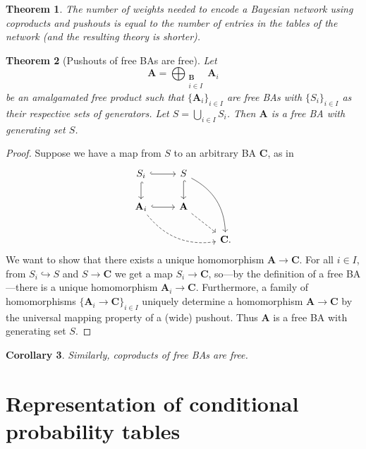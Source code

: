 \documentclass{article}
\newtheorem{theorem}{Theorem}
\newtheorem{corollary}[theorem]{Corollary}
\theoremstyle{definition}
\theoremstyle{remark}
\begin{document}
\begin{theorem}
  The number of weights needed to encode a Bayesian network using
  coproducts and pushouts is equal to the number of entries in the tables of the
  network (and the resulting theory is shorter).
\end{theorem}

\begin{theorem}[Pushouts of free BAs are free]
  Let
  \[
    \mathbf{A} = \bigoplus_{\substack{\mathbf{B}\\ i \in I}} \mathbf{A}_i
  \]
  be an amalgamated free product such that $\{ \mathbf{A}_{i} \}_{i \in I}$ are
  free BAs with $\{ S_i \}_{i \in I}$ as their respective sets of generators.
  Let $S = \bigcup_{i \in I} S_i$. Then $\mathbf{A}$ is a free BA with
  generating set $S$.
\end{theorem}
\begin{proof}
  Suppose we have a map from $S$ to an arbitrary BA $\mathbf{C}$, as in
  \[
    \begin{tikzcd}
      S_i \ar[r,hookrightarrow] \ar[d,hookrightarrow] & S \ar[d,hookrightarrow]
      \ar[ddr,bend left] & \\
      \mathbf{A}_i \ar[r,hookrightarrow] \ar[rrd,dashed,bend right] & \mathbf{A}
      \ar[rd,dashed]& \\
      & & \mathbf{C}.
    \end{tikzcd}
  \]
  We want to show that there exists a unique homomorphism $\mathbf{A} \to
  \mathbf{C}$. For all $i \in I$, from $S_i \hookrightarrow S$ and $S \to
  \mathbf{C}$ we get a map $S_i \to \mathbf{C}$, so---by the definition of a
  free BA---there is a unique homomorphism $\mathbf{A}_i \to \mathbf{C}$.
  Furthermore, a family of homomorphisms $\{ \mathbf{A}_i \to \mathbf{C} \}_{i
    \in I}$ uniquely determine a homomorphism $\mathbf{A} \to \mathbf{C}$ by the
  universal mapping property of a (wide) pushout. Thus $\mathbf{A}$ is a free BA
  with generating set $S$.
\end{proof}

\begin{corollary}
  Similarly, coproducts of free BAs are free.
\end{corollary}

\section{Representation of conditional probability tables}
\end{document}
